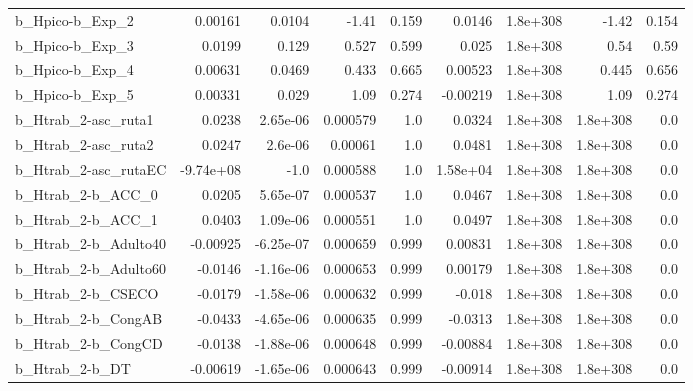 \begin{tabular}{lrrrrrrrr}
b\_Hpico-b\_Exp\_2              &     0.00161 &       0.0104 &     -1.41 &    0.159 &     0.0146 &    1.8e+308 &        -1.42 &         0.154 \\
b\_Hpico-b\_Exp\_3              &      0.0199 &        0.129 &     0.527 &    0.599 &      0.025 &    1.8e+308 &         0.54 &          0.59 \\
b\_Hpico-b\_Exp\_4              &     0.00631 &       0.0469 &     0.433 &    0.665 &    0.00523 &    1.8e+308 &        0.445 &         0.656 \\
b\_Hpico-b\_Exp\_5              &     0.00331 &        0.029 &      1.09 &    0.274 &   -0.00219 &    1.8e+308 &         1.09 &         0.274 \\
b\_Htrab\_2-asc\_ruta1          &      0.0238 &     2.65e-06 &  0.000579 &      1.0 &     0.0324 &    1.8e+308 &     1.8e+308 &           0.0 \\
b\_Htrab\_2-asc\_ruta2          &      0.0247 &      2.6e-06 &   0.00061 &      1.0 &     0.0481 &    1.8e+308 &     1.8e+308 &           0.0 \\
b\_Htrab\_2-asc\_rutaEC         &   -9.74e+08 &         -1.0 &  0.000588 &      1.0 &   1.58e+04 &    1.8e+308 &     1.8e+308 &           0.0 \\
b\_Htrab\_2-b\_ACC\_0            &      0.0205 &     5.65e-07 &  0.000537 &      1.0 &     0.0467 &    1.8e+308 &     1.8e+308 &           0.0 \\
b\_Htrab\_2-b\_ACC\_1            &      0.0403 &     1.09e-06 &  0.000551 &      1.0 &     0.0497 &    1.8e+308 &     1.8e+308 &           0.0 \\
b\_Htrab\_2-b\_Adulto40         &    -0.00925 &    -6.25e-07 &  0.000659 &    0.999 &    0.00831 &    1.8e+308 &     1.8e+308 &           0.0 \\
b\_Htrab\_2-b\_Adulto60         &     -0.0146 &    -1.16e-06 &  0.000653 &    0.999 &    0.00179 &    1.8e+308 &     1.8e+308 &           0.0 \\
b\_Htrab\_2-b\_CSECO            &     -0.0179 &    -1.58e-06 &  0.000632 &    0.999 &     -0.018 &    1.8e+308 &     1.8e+308 &           0.0 \\
b\_Htrab\_2-b\_CongAB           &     -0.0433 &    -4.65e-06 &  0.000635 &    0.999 &    -0.0313 &    1.8e+308 &     1.8e+308 &           0.0 \\
b\_Htrab\_2-b\_CongCD           &     -0.0138 &    -1.88e-06 &  0.000648 &    0.999 &   -0.00884 &    1.8e+308 &     1.8e+308 &           0.0 \\
b\_Htrab\_2-b\_DT               &    -0.00619 &    -1.65e-06 &  0.000643 &    0.999 &   -0.00914 &    1.8e+308 &     1.8e+308 &           0.0 \\

\end{tabular}
